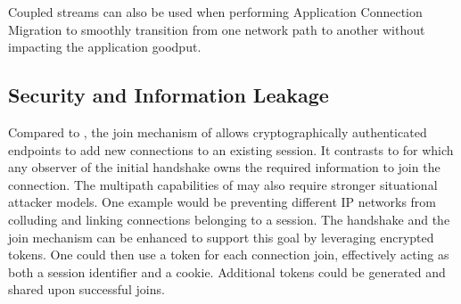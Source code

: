 Coupled streams can also be used when performing Application Connection
Migration to smoothly transition from one network path to another without
impacting the application goodput.

\subsection{Security and Information Leakage}

Compared to \mptcp, the join mechanism of \tcpls allows
cryptographically authenticated endpoints to add new \tcp connections to an
existing \tcpls session. It contrasts to \mptcp for which any observer of the
initial handshake owns the required information to join the \mptcp
connection. The multipath capabilities of \tcpls may also require stronger
situational attacker models. One example would be preventing different IP
networks from colluding and linking \tcp connections belonging to a
\tcpls session. The \tcpls handshake and the join mechanism can be
enhanced to support this goal by leveraging encrypted tokens. One could then
use a token for each connection join, effectively acting as both a session
identifier and a cookie. Additional tokens could be generated and shared upon
successful joins.





